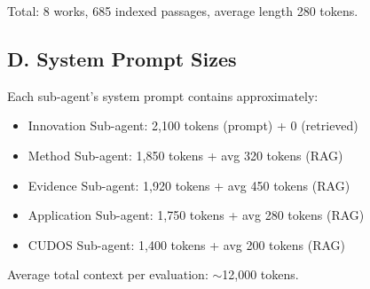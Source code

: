 \documentclass[11pt,a4paper]{article}
\newcommand{\subagent}{sub-agent}
\begin{document}
Total: 8 works, 685 indexed passages, average length 280 tokens.

\subsection{D. System Prompt Sizes}

Each \subagent{}'s system prompt contains approximately:
\begin{itemize}
    \item Innovation Sub-agent: 2,100 tokens (prompt) + 0 (retrieved)
    \item Method Sub-agent: 1,850 tokens + avg 320 tokens (RAG)
    \item Evidence Sub-agent: 1,920 tokens + avg 450 tokens (RAG)
    \item Application Sub-agent: 1,750 tokens + avg 280 tokens (RAG)
    \item CUDOS Sub-agent: 1,400 tokens + avg 200 tokens (RAG)
\end{itemize}

Average total context per evaluation: $\sim$12,000 tokens.




\end{document}
